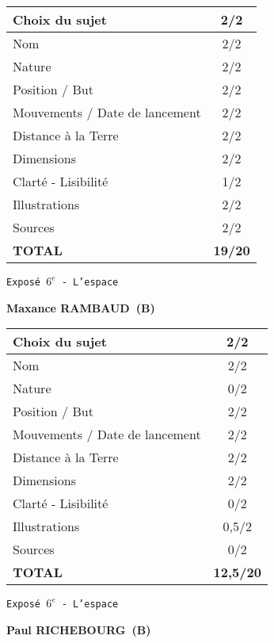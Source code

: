 	\vspace*{2cm}
	\begin{tabular}{|l|c|}
		\hline
		Choix du sujet & 2/2 \\
		\hline
		Nom & 2/2 \\
		\hline
		Nature & 2/2 \\
		\hline
		Position / But & 2/2 \\
		\hline
		Mouvements / Date de lancement & 2/2 \\
		\hline
		Distance \`a la Terre & 2/2 \\
		\hline
		Dimensions & 2/2 \\
		\hline
		Clart\'e - Lisibilit\'e & 1/2 \\
		\hline
		Illustrations & 2/2 \\
		\hline
		Sources & 2/2 \\
		\hline
		\textbf{TOTAL}  & \textbf{19/20} \\
		\hline
	\end{tabular}
	\newline
	\LARGE{\texttt{Expos\'e $6^e$ - L'espace}}
	\vspace*{1cm}

	\textbf{Maxance RAMBAUD\ (B)}

	\vspace*{2cm}
	\begin{tabular}{|l|c|}
		\hline
		Choix du sujet & 2/2 \\
		\hline
		Nom & 2/2 \\
		\hline
		Nature & 0/2 \\
		\hline
		Position / But & 2/2 \\
		\hline
		Mouvements / Date de lancement & 2/2 \\
		\hline
		Distance \`a la Terre & 2/2 \\
		\hline
		Dimensions & 2/2 \\
		\hline
		Clart\'e - Lisibilit\'e & 0/2 \\
		\hline
		Illustrations & 0,5/2 \\
		\hline
		Sources & 0/2 \\
		\hline
		\textbf{TOTAL}  & \textbf{12,5/20} \\
		\hline
	\end{tabular}
	\newline
	\LARGE{\texttt{Expos\'e $6^e$ - L'espace}}
	\vspace*{1cm}

	\textbf{Paul RICHEBOURG\ (B)}

